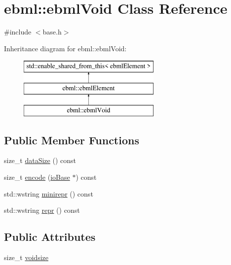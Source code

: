 \hypertarget{classebml_1_1ebmlVoid}{}\section{ebml\+:\+:ebml\+Void Class Reference}
\label{classebml_1_1ebmlVoid}


{\ttfamily \#include $<$base.\+h$>$}

Inheritance diagram for ebml\+:\+:ebml\+Void\+:\begin{figure}[H]
\begin{center}
\leavevmode
\includegraphics[height=3.000000cm]{classebml_1_1ebmlVoid}
\end{center}
\end{figure}
\subsection*{Public Member Functions}
\begin{DoxyCompactItemize}
\item 
size\+\_\+t \mbox{\hyperlink{classebml_1_1ebmlVoid_a9801f10eb9f0a5449fa39d8a31dbf315}{data\+Size}} () const
\item 
size\+\_\+t \mbox{\hyperlink{classebml_1_1ebmlVoid_ac822d7bf461ef44812596a34cccb134a}{encode}} (\mbox{\hyperlink{classebml_1_1ioBase}{io\+Base}} $\ast$) const
\item 
std\+::wstring \mbox{\hyperlink{classebml_1_1ebmlVoid_ad9baeb00b771d3ae4cdebb2078f863ad}{minirepr}} () const
\item 
std\+::wstring \mbox{\hyperlink{classebml_1_1ebmlVoid_a54f5a77bc4029d77d0a456fa8dcb53ef}{repr}} () const
\end{DoxyCompactItemize}
\subsection*{Public Attributes}
\begin{DoxyCompactItemize}
\item 
size\+\_\+t \mbox{\hyperlink{classebml_1_1ebmlVoid_a62a54e4b5ef5acf454f0240db8ee6c90}{voidsize}}
\end{DoxyCompactItemize}
